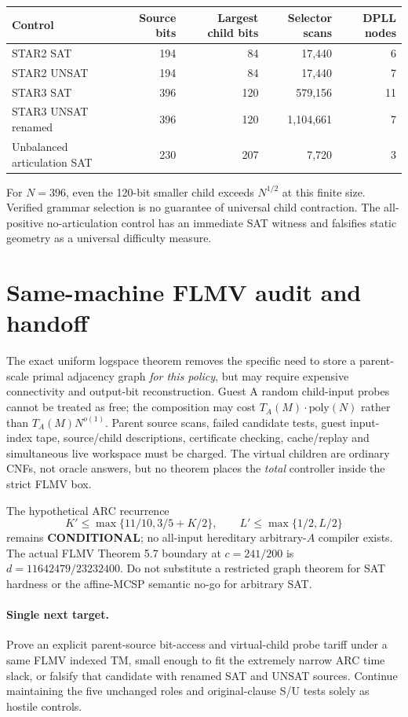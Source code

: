 \documentclass[11pt]{article}
\begin{document}
\begin{center}\begin{tabular}{lrrrr}\toprule
Control & Source bits & Largest child bits & Selector scans & DPLL nodes\\\midrule
STAR2 SAT &194&84&17,440&6\\
STAR2 UNSAT &194&84&17,440&7\\
STAR3 SAT &396&120&579,156&11\\
STAR3 UNSAT renamed &396&120&1,104,661&7\\
Unbalanced articulation SAT &230&207&7,720&3\\\bottomrule
\end{tabular}\end{center}
For $N=396$, even the 120-bit smaller child exceeds $N^{1/2}$ at this finite size. Verified grammar selection is no guarantee of universal child contraction. The all-positive no-articulation control has an immediate SAT witness and falsifies static geometry as a universal difficulty measure.

\section{Same-machine FLMV audit and handoff}
The exact uniform logspace theorem removes the specific need to store a parent-scale primal adjacency graph \emph{for this policy}, but may require expensive connectivity and output-bit reconstruction. Guest A random child-input probes cannot be treated as free; the composition may cost $T_A(M)\cdot\mathrm{poly}(N)$ rather than $T_A(M)N^{o(1)}$. Parent source scans, failed candidate tests, guest input-index tape, source/child descriptions, certificate checking, cache/replay and simultaneous live workspace must be charged. The virtual children are ordinary CNFs, not oracle answers, but no theorem places the \emph{total} controller inside the strict FLMV box.

The hypothetical ARC recurrence
\[
K'\le\max\{11/10,3/5+K/2\},\qquad
L'\le\max\{1/2,L/2\}
\]
remains \textbf{CONDITIONAL}; no all-input hereditary arbitrary-$A$ compiler exists. The actual FLMV Theorem 5.7 boundary at $c=241/200$ is $d=11642479/23232400$. Do not substitute a restricted graph theorem for SAT hardness or the affine-MCSP semantic no-go for arbitrary SAT.

\paragraph{Single next target.} Prove an explicit parent-source bit-access and virtual-child probe tariff under a same FLMV indexed TM, small enough to fit the extremely narrow ARC time slack, or falsify that candidate with renamed SAT and UNSAT sources. Continue maintaining the five unchanged roles and original-clause S/U tests solely as hostile controls.
\end{document}
